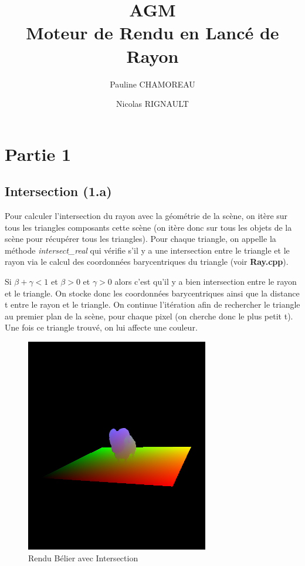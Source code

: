 \documentclass[a4paper,11pt,titlepage]{article}
\title{AGM\\Moteur de Rendu en Lancé de Rayon}
\author{Pauline CHAMOREAU \and Nicolas RIGNAULT}
\begin{document}
\maketitle

\newpage
\section{Partie 1}

\subsection{Intersection (1.a)}

Pour calculer l'intersection du rayon avec la géométrie de la scène, on itère sur tous les triangles composants cette scène (on itère donc sur tous les objets de la scène pour récupérer tous les triangles). Pour chaque triangle, on appelle la méthode \textit{intersect\_real} qui vérifie s'il y a une intersection entre le triangle et le rayon via le calcul des coordonnées barycentriques du triangle (voir \textbf{Ray.cpp}).

Si $\beta + \gamma < 1$ et $\beta > 0$ et $\gamma > 0$ alors c'est qu'il y a bien intersection entre le rayon et le triangle. On stocke donc les coordonnées barycentriques ainsi que la distance t entre le rayon et le triangle. On continue l'itération afin de rechercher le triangle au premier plan de la scène, pour chaque pixel (on cherche donc le plus petit t). Une fois ce triangle trouvé, on lui affecte une couleur.\\

\begin{figure}[H]
 \begin{center}
 \includegraphics[width=8cm]{Rendu/Intersection.png}
 \end{center}

 \caption{Rendu Bélier avec Intersection}
 \label{rendu1}
\end{figure}
\end{document}
